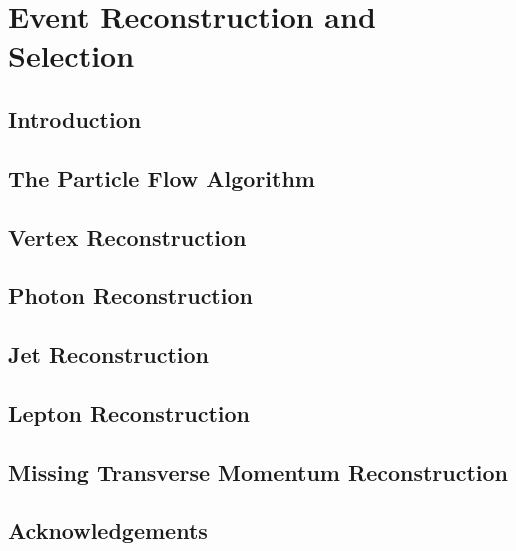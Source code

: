 \chapter{Event Reconstruction and Selection}

\section{Introduction} \label{sec:evt_intro}


\section{The Particle Flow Algorithm} \label{sec:evt_pf}


\section{Vertex Reconstruction} \label{sec:evt_vertex}


\section{Photon Reconstruction} \label{sec:evt_photon}


\section{Jet Reconstruction} \label{sec:evt_jet}


\section{Lepton Reconstruction} \label{sec:evt_lepton}


\section{Missing Transverse Momentum Reconstruction} \label{sec:evt_met}


\section{Acknowledgements} \label{sec:evt_ack}

